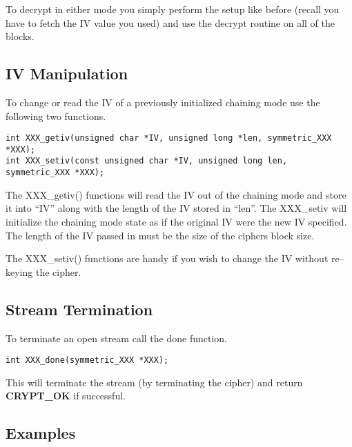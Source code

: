 \documentclass[a4paper]{book}
\begin{document}
To decrypt in either mode you simply perform the setup like before (recall you have to fetch the IV value you used)
and use the decrypt routine on all of the blocks.

\subsection{IV Manipulation}
To change or read the IV of a previously initialized chaining mode use the following two functions.

     
 
\begin{verbatim}
int XXX_getiv(unsigned char *IV, unsigned long *len, symmetric_XXX *XXX);
int XXX_setiv(const unsigned char *IV, unsigned long len, symmetric_XXX *XXX);
\end{verbatim}

The XXX\_getiv() functions will read the IV out of the chaining mode and store it into ``IV'' along with the length of the IV 
stored in ``len''.  The XXX\_setiv will initialize the chaining mode state as if the original IV were the new IV specified.  The length
of the IV passed in must be the size of the ciphers block size.

The XXX\_setiv() functions are handy if you wish to change the IV without re--keying the cipher.  

\subsection{Stream Termination}
To terminate an open stream call the done function.

  
\begin{verbatim}
int XXX_done(symmetric_XXX *XXX);
\end{verbatim}

This will terminate the stream (by terminating the cipher) and return \textbf{CRYPT\_OK} if successful.

\subsection{Examples}
\end{document}
